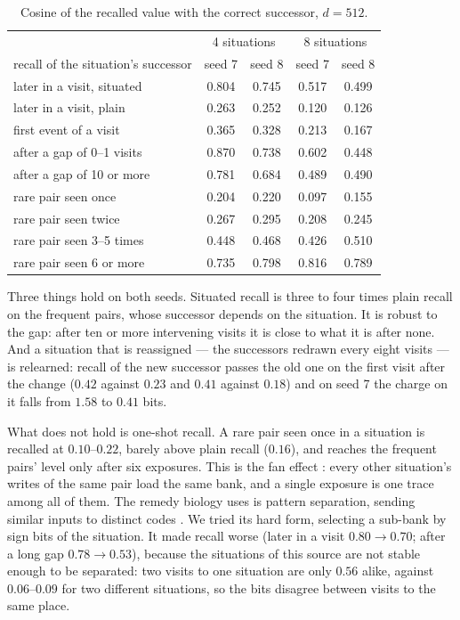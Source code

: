 \documentclass[11pt,a4paper]{article}
\theoremstyle{plain}
\theoremstyle{definition}
\theoremstyle{remark}
\begin{document}
\begin{table}[h]
\centering
\small
\begin{tabular}{lcccc}
\toprule
& \multicolumn{2}{c}{4 situations} & \multicolumn{2}{c}{8 situations}\\
recall of the situation's successor & seed 7 & seed 8 & seed 7 & seed 8\\
\midrule
later in a visit, situated & 0.804 & 0.745 & 0.517 & 0.499\\
later in a visit, plain & 0.263 & 0.252 & 0.120 & 0.126\\
first event of a visit & 0.365 & 0.328 & 0.213 & 0.167\\
after a gap of 0--1 visits & 0.870 & 0.738 & 0.602 & 0.448\\
after a gap of 10 or more & 0.781 & 0.684 & 0.489 & 0.490\\
rare pair seen once & 0.204 & 0.220 & 0.097 & 0.155\\
rare pair seen twice & 0.267 & 0.295 & 0.208 & 0.245\\
rare pair seen 3--5 times & 0.448 & 0.468 & 0.426 & 0.510\\
rare pair seen 6 or more & 0.735 & 0.798 & 0.816 & 0.789\\
\bottomrule
\end{tabular}
\caption{Cosine of the recalled value with the correct successor, $d=512$.}
\label{tab:situated}
\end{table}

Three things hold on both seeds. Situated recall is three to four times plain
recall on the frequent pairs, whose successor depends on the situation. It is
robust to the gap: after ten or more intervening visits it is close to what it
is after none. And a situation that is reassigned --- the successors redrawn
every eight visits --- is relearned: recall of the new successor passes the
old one on the first visit after the change ($0.42$ against $0.23$ and $0.41$
against $0.18$) and on seed 7 the charge on it falls from $1.58$ to $0.41$ bits.

What does not hold is one-shot recall. A rare pair seen once in a situation is
recalled at $0.10$--$0.22$, barely above plain recall ($0.16$), and reaches the
frequent pairs' level only after six exposures. This is the fan effect
\citep{anderson1974retrieval}: every other situation's writes of the same pair
load the same bank, and a single exposure is one trace among all of them. The
remedy biology uses is pattern separation, sending similar inputs to distinct
codes \citep{yassa2011pattern}. We tried its hard form, selecting a sub-bank by
sign bits of the situation. It made recall worse (later in a visit
$0.80\to0.70$; after a long gap $0.78\to0.53$), because the situations of this
source are not stable enough to be separated: two visits to one situation are
only $0.56$ alike, against $0.06$--$0.09$ for two different situations, so the
bits disagree between visits to the same place.
\end{document}
